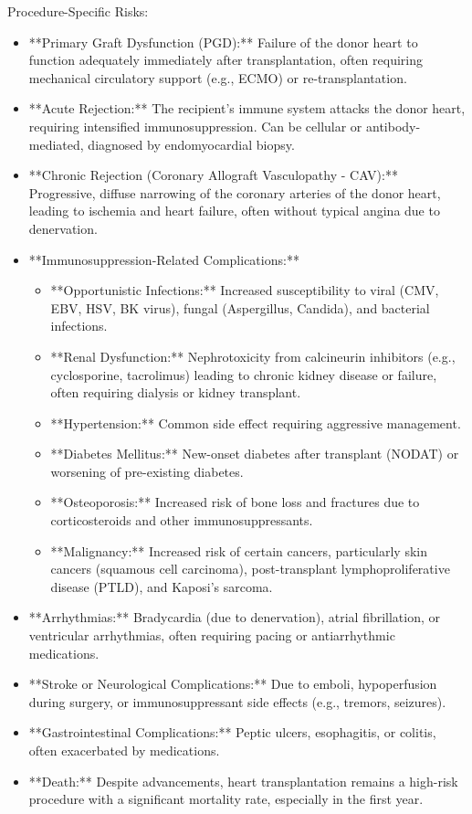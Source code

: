 Procedure-Specific Risks:

\begin{itemize}
  \item **Primary Graft Dysfunction (PGD):** Failure of the donor heart to function adequately immediately after transplantation, often requiring mechanical circulatory support (e.g., ECMO) or re-transplantation.
  \item **Acute Rejection:** The recipient's immune system attacks the donor heart, requiring intensified immunosuppression. Can be cellular or antibody-mediated, diagnosed by endomyocardial biopsy.
  \item **Chronic Rejection (Coronary Allograft Vasculopathy - CAV):** Progressive, diffuse narrowing of the coronary arteries of the donor heart, leading to ischemia and heart failure, often without typical angina due to denervation.
  \item **Immunosuppression-Related Complications:**
    \begin{itemize}
      \item **Opportunistic Infections:** Increased susceptibility to viral (CMV, EBV, HSV, BK virus), fungal (Aspergillus, Candida), and bacterial infections.
      \item **Renal Dysfunction:** Nephrotoxicity from calcineurin inhibitors (e.g., cyclosporine, tacrolimus) leading to chronic kidney disease or failure, often requiring dialysis or kidney transplant.
      \item **Hypertension:** Common side effect requiring aggressive management.
      \item **Diabetes Mellitus:** New-onset diabetes after transplant (NODAT) or worsening of pre-existing diabetes.
      \item **Osteoporosis:** Increased risk of bone loss and fractures due to corticosteroids and other immunosuppressants.
      \item **Malignancy:** Increased risk of certain cancers, particularly skin cancers (squamous cell carcinoma), post-transplant lymphoproliferative disease (PTLD), and Kaposi's sarcoma.
    \end{itemize}
  \item **Arrhythmias:** Bradycardia (due to denervation), atrial fibrillation, or ventricular arrhythmias, often requiring pacing or antiarrhythmic medications.
  \item **Stroke or Neurological Complications:** Due to emboli, hypoperfusion during surgery, or immunosuppressant side effects (e.g., tremors, seizures).
  \item **Gastrointestinal Complications:** Peptic ulcers, esophagitis, or colitis, often exacerbated by medications.
  \item **Death:** Despite advancements, heart transplantation remains a high-risk procedure with a significant mortality rate, especially in the first year.
\end{itemize}

